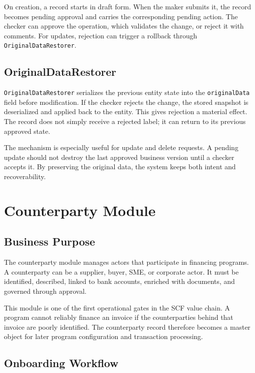 On creation, a record starts in draft form. When the maker submits it, the record becomes pending approval and carries the corresponding pending action. The checker can approve the operation, which validates the change, or reject it with comments. For updates, rejection can trigger a rollback through \texttt{OriginalDataRestorer}.

\subsection{OriginalDataRestorer}
\label{subsec:original_data_restorer}

\texttt{OriginalDataRestorer} serializes the previous entity state into the \texttt{originalData} field before modification. If the checker rejects the change, the stored snapshot is deserialized and applied back to the entity. This gives rejection a material effect. The record does not simply receive a rejected label; it can return to its previous approved state.

The mechanism is especially useful for update and delete requests. A pending update should not destroy the last approved business version until a checker accepts it. By preserving the original data, the system keeps both intent and recoverability.

\section{Counterparty Module}
\label{sec:counterparty_module}

\subsection{Business Purpose}
\label{subsec:counterparty_business_purpose}

The counterparty module manages actors that participate in financing programs. A counterparty can be a supplier, buyer, SME, or corporate actor. It must be identified, described, linked to bank accounts, enriched with documents, and governed through approval.

This module is one of the first operational gates in the SCF value chain. A program cannot reliably finance an invoice if the counterparties behind that invoice are poorly identified. The counterparty record therefore becomes a master object for later program configuration and transaction processing.

\subsection{Onboarding Workflow}
\label{subsec:counterparty_onboarding}

